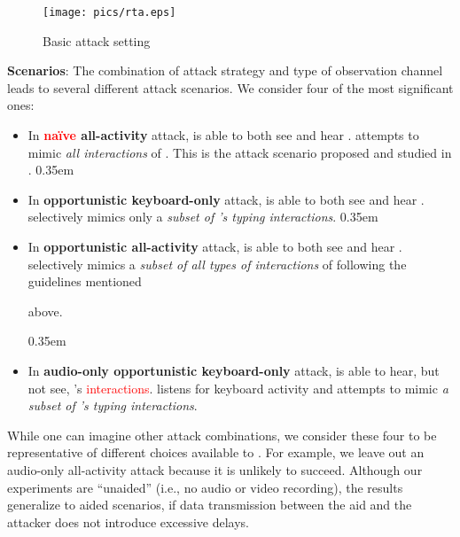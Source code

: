 \documentclass[conference]{IEEEtran}
\newcommand{\KBactivity}{keyboard-only\xspace}
\newcommand{\allactivity}{all-activity\xspace}
\newcommand{\attacker}{\xspace}
\newcommand{\victim}{\xspace}
\newif\ifllncs
\newcommand\changeMika[1]{\textcolor{red}{#1}}
\newcommand\changeAsokan[1]{\textcolor{red}{#1}}
\newcommand\changeMika[1]{{#1}}
\newcommand\changeAsokan[1]{{#1}}
\begin{document}
\begin{figure*}[!htbp]
\centering
\vspace{-5mm}
\texttt{[image: pics/rta.eps]}
\vspace{-3mm}
\caption{Basic attack setting}
\label{fig:rta-scenario}
\end{figure*}








\vspace{1mm}
\noindent\textbf{Scenarios}: The combination of attack strategy and
type of observation channel leads to several different attack scenarios. We consider four of the most significant ones:

\begin{itemize}
\itemsep0em
\item In \textbf{\changeMika{na\"ive} \allactivity} attack, \attacker is able to both see and hear \victim. \attacker attempts to mimic \textit{all interactions} of \victim. This is the attack scenario proposed and studied in \cite{mare2014zebra}.
\itemsep0.35em
\item In \textbf{opportunistic \KBactivity} attack, \attacker is able to both see and hear \victim. \attacker selectively mimics only a \textit{subset of \victim's typing interactions}.
\itemsep0.35em
\item In \textbf{opportunistic \allactivity} attack, \attacker is able to both see and hear \victim. \attacker selectively mimics a \textit{subset of all types of interactions} of \victim following the guidelines mentioned 
\ifllncs
in Appendix~\ref{app:extra_attackers}.
\else
above.
\fi
\itemsep0.35em
\item In \textbf{audio-only opportunistic \KBactivity} attack, \attacker is able to hear, but not see, \victim's \changeAsokan{interactions}. \attacker listens for keyboard activity and attempts to mimic \textit{a subset of \victim's typing interactions}.


\end{itemize}
	
	While one can imagine other attack combinations, we consider these four to be representative of different choices available to \attacker. For example, we leave out an audio-only \allactivity attack because it is unlikely to succeed. Although our experiments are ``unaided'' (i.e., no audio or video recording), the results generalize to aided scenarios, if data transmission between the aid and the attacker does not introduce excessive delays.
\end{document}
